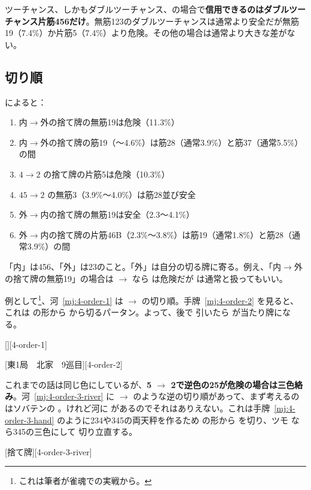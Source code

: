 \documentclass[../nankiru_main.tex]{subfiles}
\begin{document}
ツーチャンス、しかもダブルツーチャンス、の場合で\textbf{信用できるのはダブルツーチャンス片筋456だけ}\citep[][p. 174]{miinin-stat}。無筋123のダブルツーチャンスは通常より安全だが無筋19（7.4\%）か片筋5（7.4\%）より危険。その他の場合は通常より大きな差がない。

\subsection{切り順}

\citet[p. 176]{miinin-stat}によると：
%
\begin{enumerate}
\item 内$\to$外の捨て牌の無筋19は危険（11.3\%）
\item 内$\to$外の捨て牌の筋19（〜4.6\%）は筋28（通常3.9\%）と筋37（通常5.5\%）の間
\item $4 \to 2$ の捨て牌の片筋5は危険（10.3\%）
\item $45 \to 2$ の無筋3（3.9\%〜4.0\%）は筋28並び安全
\item 外$\to$内の捨て牌の無筋19は安全（2.3〜4.1\%）
\item 外$\to$内の捨て牌の片筋46B（2.3\%〜3.8\%）は筋19（通常1.8\%）と筋28（通常3.9\%）の間
\end{enumerate}

「内」は456、「外」は23のこと。「外」は自分の切る牌に寄る。例え、「内$\to$外の捨て牌の無筋19」の場合は  $\to$  なら  は危険だが  は通常と扱ってもいい。

例として\footnote{これは筆者が雀魂での実戦から。}、河~\ref{mj:4-order-1} は  $\to$  の切り順。手牌~\ref{mj:4-order-2} を見ると、これは  の形から  から切るパータン。よって、後で  引いたら  が当たり牌になる。

[][4-order-1]

[東1局　北家　9巡目][4-order-2]

これまでの話は同じ色にしているが、\textbf{5 $\to$ 2で逆色の25が危険の場合は三色絡み}\citep[][pp.~108--109]{takizawa-yomi}。河~\ref{mj:4-order-3-river} に  $\to$  のような逆の切り順があって、まず考えるのはソバテンの 。けれど河に  があるのでそれはありえない。これは手牌~\ref{mj:4-order-3-hand} のように234や345の両天秤を作るため  の形から  を切り、ツモ  なら345の三色にして  切り立直する。

[捨て牌][4-order-3-river]
\end{document}

